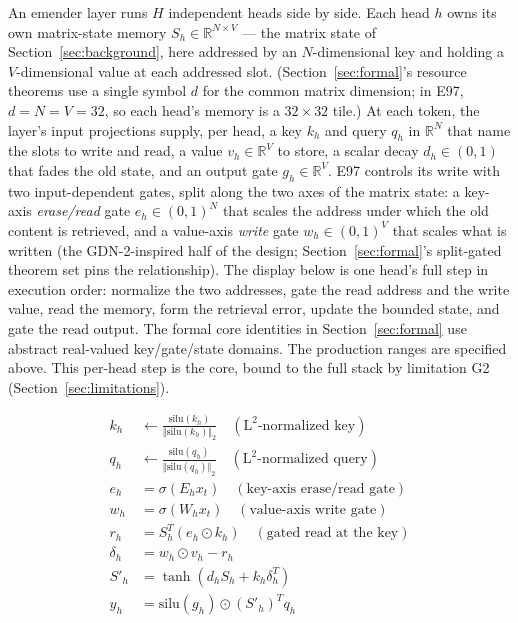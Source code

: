 \documentclass[10pt]{article}
\theoremstyle{canonical}
\theoremstyle{canonicalbullet}
\begin{document}
An emender layer runs $H $ independent heads side by side. Each head $h $ owns its own matrix-state memory ${S }_{h } \in  {\mathbb{R} }^{N  \times  V }$ --- the matrix state of Section~\ref{sec:background}, here addressed by an $N $-dimensional key and holding a $V $-dimensional value at each addressed slot. (Section~\ref{sec:formal}'s resource theorems use a single symbol $d $ for the common matrix dimension; in E97, $d  =  N  =  V  =  32$, so each head's memory is a $32 \times  32$ tile.) At each token, the layer's input projections supply, per head, a key ${k }_{h }$ and query ${q }_{h }$ in ${\mathbb{R} }^{N }$ that name the slots to write and read, a value ${v }_{h } \in  {\mathbb{R} }^{V }$ to store, a scalar decay ${d }_{h } \in  ( 0, 1) $ that fades the old state, and an output gate ${g }_{h } \in  {\mathbb{R} }^{V }$. E97 controls its write with two input-dependent gates, split along the two axes of the matrix state: a key-axis \emph{erase/read} gate ${e }_{h } \in  {( 0, 1) }^{N }$ that scales the address under which the old content is retrieved, and a value-axis \emph{write} gate ${w }_{h } \in  {( 0, 1) }^{V }$ that scales what is written (the GDN-2-inspired half of the design; Section~\ref{sec:formal}'s split-gated theorem set pins the relationship). The display below is one head's full step in execution order: normalize the two addresses, gate the read address and the write value, read the memory, form the retrieval error, update the bounded state, and gate the read output. The formal core identities in Section~\ref{sec:formal} use abstract real-valued key/gate/state domains. The production ranges are specified above. This per-head step is the core, bound to the full stack by limitation G2 (Section~\ref{sec:limitations}).


\[\begin{aligned}{k }_{h } &\leftarrow  \frac{\text{silu}( {k }_{h }) }{{\Vert \text{silu}( {k }_{h }) \Vert }_{2}} \quad  ( {\text{L}}^{2} \text{-normalized key}) \\ {q }_{h } &\leftarrow  \frac{\text{silu}( {q }_{h }) }{{\Vert \text{silu}( {q }_{h }) \Vert }_{2}} \quad  ( {\text{L}}^{2} \text{-normalized query}) \\ {e }_{h } &=  \sigma ( {E }_{h } {x }_{t })  \quad  ( \text{key-axis erase/read gate}) \\ {w }_{h } &=  \sigma ( {W }_{h } {x }_{t })  \quad  ( \text{value-axis write gate}) \\ {r }_{h } &=  {S }_{h }^{T } ( {e }_{h } \odot  {k }_{h })  \quad  ( \text{gated read at the key}) \\ {\delta }_{h } &=  {w }_{h } \odot  {v }_{h } -  {r }_{h } \\ {{S }'_{h }} &=  \operatorname{tanh}( {d }_{h } {S }_{h } +  {k }_{h } {\delta }_{h }^{T })  \\ {y }_{h } &=  \text{silu}( {g }_{h })  \odot  {( {{S }'_{h }}) }^{T } {q }_{h }\end{aligned}\]
\end{document}
